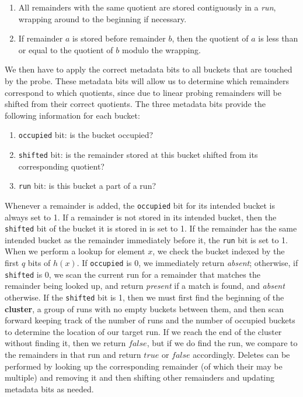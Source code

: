 \documentclass[../paper.tex]{subfiles}
\begin{document}
\begin{enumerate}
    \item All remainders with the same quotient are stored contiguously in a \textit{run}, wrapping around to the beginning if necessary.
    \item If remainder $a$ is stored before remainder $b$, then the quotient of $a$ is less than or equal to the quotient of $b$ modulo the wrapping.
\end{enumerate}

We then have to apply the correct metadata bits to all buckets that are touched by the probe. These metadata
bits will allow us to determine which remainders correspond to which quotients,
since due to linear probing remainders will be shifted from their correct quotients.
The three metadata bits provide the following information for each bucket:

\begin{enumerate}
    \item \texttt{occupied} bit: is the bucket occupied?
    \item \texttt{shifted} bit: is the remainder stored at this bucket shifted from its corresponding quotient?
    \item \texttt{run} bit: is this bucket a part of a run?
\end{enumerate}

    Whenever a remainder is
    added, the \texttt{occupied} bit for its intended bucket is always set to 1.  If
    a remainder is not stored in its intended bucket, then the \texttt{shifted} bit
    of the bucket it is stored in is set to 1.  If the remainder has the same
    intended bucket as the remainder immediately before it, the \texttt{run} bit is set to 1.  When we
    perform a lookup for element $x$, we check the bucket indexed by the first
    $q$ bits of $h(x)$.  If \texttt{occupied} is 0, we immediately return
    \textit{absent}; otherwise, if \texttt{shifted} is 0, we scan the current run for a remainder
    that matches the remainder being looked up, and return \textit{present} if a match is found,
    and \textit{absent} otherwise.
    If the \texttt{shifted} bit is 1, then we must
    first find the beginning of the {\bf cluster}, a group of runs with no
    empty buckets between them, and then scan forward keeping track of the
    number of runs and the number of occupied buckets to determine the location
    of our target run.  If we reach the end of the cluster without finding it,
    then we return $false$, but if we do find the run, we compare to the
    remainders in that run and return $true$ or $false$ accordingly.  Deletes
    can be performed by looking up the corresponding remainder (of which their
    may be multiple) and removing it and then shifting other remainders and
    updating metadata bits as needed.
\end{document}
